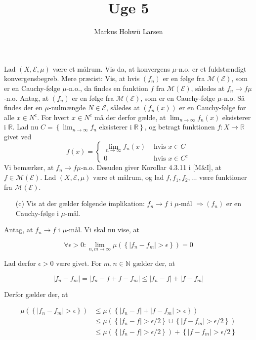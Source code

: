 \documentclass{Class}
\title{Uge 5}
\author{Markus Hohwü Larsen}
\begin{document}
Lad $(X, \mathcal{E}, \mu)$ være et målrum. Vis da, at konvergens $\mu$-n.o. er et fuldstændigt konvergensbegreb. Mere præcist: Vis, at hvis $\left(f_n\right)$ er en følge fra $\mathcal{M}(\mathcal{E})$, som er en Cauchy-følge $\mu$-n.o., da findes en funktion $f$ fra $\mathcal{M}(\mathcal{E})$, således at $f_n \rightarrow f \mu$-n.o.
\solution 
Antag, at $\left(f_n\right)$ er en følge fra $\mathcal{M}(\mathcal{E})$, som er en Cauchy-følge $\mu$-n.o. Så findes der en $\mu$-nulmængde $N \in \mathcal{E}$, således at $\left(f_n(x)\right)$ er en Cauchy-følge for alle $x \in N^{\mathrm{c}}$. For hvert $x \in N^c$ må der derfor gælde, at $\lim _{n \rightarrow \infty} f_n(x)$ eksisterer i $\mathbb{R}$. Lad nu $C=\left\{\lim _{n \rightarrow \infty} f_n\right.$ eksisterer i $\left.\mathbb{R}\right\}$, og betragt funktionen $f: X \rightarrow \mathbb{R}$ givet ved
$$
f(x)= \begin{cases}\lim _{n \rightarrow \infty} f_n(x) & \text { hvis } x \in C \\ 0 & \text { hvis } x \in C^c\end{cases}
$$
Vi bemærker, at $f_n \rightarrow f \mu$-n.o. Desuden giver Korollar 4.3.11 i [M\&I], at $f \in \mathcal{M}(\mathcal{E})$.
Lad $(X, \mathcal{E}, \mu)$ være et målrum, og lad $f, f_1, f_2, \ldots$ være funktioner fra $\mathcal{M}(\mathcal{E})$.
\begin{enumerate}
    \item[(c)]Vis at der gælder folgende implikation: $f_n \rightarrow f$ i $\mu$-mål $\Longrightarrow\left(f_n\right)$ er en Cauchy-følge i $\mu$-mål.
\end{enumerate}
\solution
Antag, at $f_n \rightarrow f$ i $\mu$-mål. Vi skal nu vise, at

$$
\forall \epsilon>0: \lim _{n, m \rightarrow \infty} \mu\left(\left\{\left|f_n-f_m\right|>\epsilon\right\}\right)=0
$$


Lad derfor $\epsilon>0$ være givet. For $m, n \in \mathbb{N}$ gælder der, at

$$
\left|f_n-f_m\right|=\left|f_n-f+f-f_m\right| \leq\left|f_n-f\right|+\left|f-f_m\right|
$$


Derfor gælder der, at

$$
\begin{aligned}
\mu\left(\left\{\left|f_n-f_m\right|>\epsilon\right\}\right) & \leq \mu\left(\left\{\left|f_n-f\right|+\left|f-f_m\right|>\epsilon\right\}\right) \\
& \leq \mu\left(\left\{\left|f_n-f\right|>\epsilon / 2\right\} \cup\left\{\left|f-f_m\right|>\epsilon / 2\right\}\right) \\
& \leq \mu\left(\left\{\left|f_n-f\right|>\epsilon / 2\right\}\right)+\left\{\left|f-f_m\right|>\epsilon / 2\right\}
\end{aligned}
$$
\end{document}
